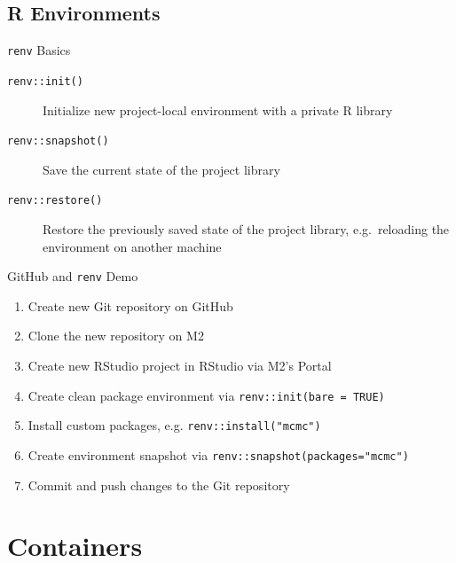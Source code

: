\documentclass[aspectratio=169]{beamer}
\begin{document}
\subsection{R Environments}

\begin{frame}{\texttt{renv} Basics}
\begin{description}
\item[\texttt{renv::init()}] Initialize new project-local environment with a private R library
\item[\texttt{renv::snapshot()}] Save the current state of the project library
\item[\texttt{renv::restore()}] Restore the previously saved state of the project library, e.g.\ reloading the environment on another machine
\end{description}
\end{frame}

\begin{frame}{GitHub and \texttt{renv} Demo}
\begin{enumerate}
\item Create new Git repository on GitHub
\item Clone the new repository on M2
\item Create new RStudio project in RStudio via M2's Portal
\item Create clean package environment via \texttt{renv::init(bare = TRUE)}
\item Install custom packages, e.g. \texttt{renv::install("mcmc")}
\item Create environment snapshot via \texttt{renv::snapshot(packages="mcmc")}
\item Commit and push changes to the Git repository
\end{enumerate}
\end{frame}

\section{Containers}
\end{document}
